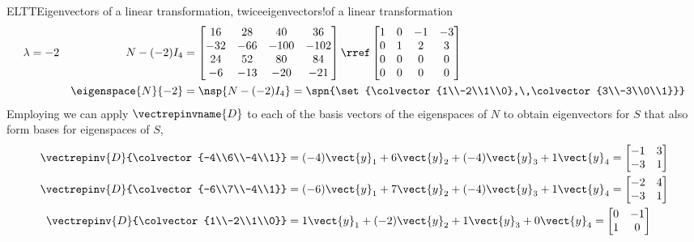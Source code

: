 \begin{example}{ELTT}{Eigenvectors of a linear transformation, twice}{eigenvectors!of a linear transformation}
\begin{align*}
\lambda&=-2&N-(-2)I_4&=
\begin{bmatrix}
 16 & 28 & 40 & 36 \\
 -32 & -66 & -100 & -102 \\
 24 & 52 & 80 & 84 \\
 -6 & -13 & -20 & -21
\end{bmatrix}
\rref
\begin{bmatrix}
 1 & 0 & -1 & -3 \\
 0 & 1 & 2 & 3 \\
 0 & 0 & 0 & 0 \\
 0 & 0 & 0 & 0
\end{bmatrix}\\
&&\eigenspace{N}{-2}&=\nsp{N-(-2)I_4}
=\spn{\set{\colvector{1\\-2\\1\\0},\,\colvector{3\\-3\\0\\1}}}
\end{align*}
%
Employing  we can apply $\vectrepinvname{D}$ to each of the basis vectors of the eigenspaces of $N$ to obtain eigenvectors for $S$ that also form bases for eigenspaces of $S$,
%
\begin{align*}
\vectrepinv{D}{\colvector{-4\\6\\-4\\1}}
&=
(-4)\vect{y}_1+6\vect{y}_2+(-4)\vect{y}_3+1\vect{y}_4=
\begin{bmatrix}-1 & 3\\-3 & 1\end{bmatrix}\\
%
\vectrepinv{D}{\colvector{-6\\7\\-4\\1}}
&=
(-6)\vect{y}_1+7\vect{y}_2+(-4)\vect{y}_3+1\vect{y}_4=
\begin{bmatrix}-2 & 4\\-3 & 1\end{bmatrix}\\
%
\vectrepinv{D}{\colvector{1\\-2\\1\\0}}
&=
1\vect{y}_1+(-2)\vect{y}_2+1\vect{y}_3+0\vect{y}_4=
\begin{bmatrix}0 & -1\\1 & 0\end{bmatrix}\\

\end{align*}
\end{example}
